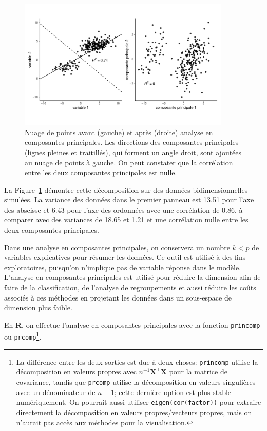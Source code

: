 \documentclass[
  11pt,
  letterpaper,
]{scrbook}
\theoremstyle{definition}
\theoremstyle{remark}
\begin{document}
\begin{figure}[ht!]

{\centering \includegraphics[width=0.9\textwidth,height=\textheight]{analysefactorielle_files/figure-pdf/fig-acprotation-1.pdf}

}

\caption{\label{fig-acprotation}Nuage de points avant (gauche) et après
(droite) analyse en composantes principales. Les directions des
composantes principales (lignes pleines et traitillés), qui forment un
angle droit, sont ajoutées au nuage de points à gauche. On peut
constater que la corrélation entre les deux composantes principales est
nulle.}

\end{figure}

La Figure~\ref{fig-acprotation} démontre cette décomposition sur des
données bidimensionnelles simulées. La variance des données dans le
premier panneau est 13.51 pour l'axe des abscisse et 6.43 pour l'axe des
ordonnées avec une corrélation de 0.86, à comparer avec des variances de
18.65 et 1.21 et une corrélation nulle entre les deux composantes
principales.

Dans une analyse en composantes principales, on conservera un nombre
\(k<p\) de variables explicatives pour résumer les données. Ce outil est
utilisé à des fins exploratoires, puisqu'on n'implique pas de variable
réponse dans le modèle. L'analyse en composantes principales est utilisé
pour réduire la dimension afin de faire de la classification, de
l'analyse de regroupements et aussi réduire les coûts associés à ces
méthodes en projetant les données dans un sous-espace de dimension plus
faible.

En \textbf{R}, on effectue l'analyse en composantes principales avec la
fonction \texttt{princomp} ou \texttt{prcomp}\footnote{La différence
  entre les deux sorties est due à deux choses: \texttt{princomp}
  utilise la décomposition en valeurs propres avec
  \(n^{-1}\mathbf{X}^\top\mathbf{X}\) pour la matrice de covariance,
  tandis que \texttt{prcomp} utilise la décomposition en valeurs
  singulières avec un dénominateur de \(n-1\); cette dernière option est
  plus stable numériquement. On pourrait aussi utiliser
  \texttt{eigen(cor(factor))} pour extraire directement la décomposition
  en valeurs propres/vecteurs propres, mais on n'aurait pas accès aux
  méthodes pour la visualisation.}.
\end{document}
